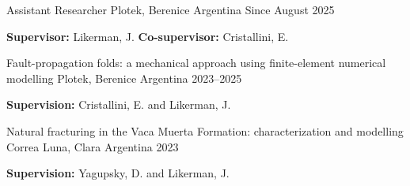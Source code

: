 

\begin{cventries}
\cventry
    {Assistant Researcher}
    {Plotek, Berenice}
    {Argentina}
    {Since August 2025}
    {
      \begin{cvitems}
        \item {\textbf{Supervisor:} Likerman, J. \textbf{Co-supervisor:} Cristallini, E.}
      \end{cvitems}
    }
\end{cventries}


\begin{cventries}
\cventry
    {Fault-propagation folds: a mechanical approach using finite-element numerical modelling}
    {Plotek, Berenice}
    {Argentina}
    {2023--2025}
    {
      \begin{cvitems}
        \item {\textbf{Supervision:} Cristallini, E. and Likerman, J.}
      \end{cvitems}
    }
\end{cventries}


\begin{cventries}
\cventry
    {Natural fracturing in the Vaca Muerta Formation: characterization and modelling}
    {Correa Luna, Clara}
    {Argentina}
    {2023}
    {
      \begin{cvitems}
        \item {\textbf{Supervision:} Yagupsky, D. and Likerman, J.}
      \end{cvitems}
    }
\end{cventries}


